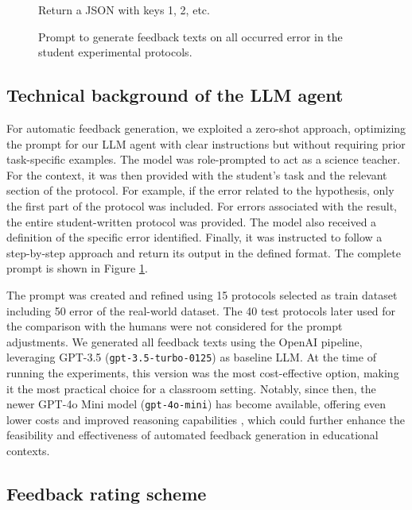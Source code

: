 \begin{figure}[htbp]
\begin{tcolorbox}[colback=gray!5!white, colframe=gray!75!black, width=\textwidth, arc=1mm, auto outer arc, boxrule=0.2mm, title=Prompt for automated feedback generation on experimental protocols]
\begin{small}
        Return a JSON with keys 1, 2, etc.
    \end{small}
    \end{tcolorbox}
    \caption{Prompt to generate feedback texts on all occurred error in the student experimental protocols.}\label{fig:prompt}
\end{figure}

\subsection{Technical background of the LLM agent}
For automatic feedback generation, we exploited a zero-shot approach, optimizing the prompt for our LLM agent with clear instructions but without requiring prior task-specific examples.
The model was role-prompted to act as a science teacher. For the context, it was then provided with the student's task and the relevant section of the protocol. For example, if the error related to the hypothesis, only the first part of the protocol was included. For errors associated with the result, the entire student-written protocol was provided. The model also received a definition of the specific error identified. Finally, it was instructed to follow a step-by-step approach and return its output in the defined format. The complete prompt is shown in Figure \ref{fig:prompt}.

The prompt was created and refined using 15 protocols selected as train dataset including 50 error of the real-world dataset. The 40 test protocols later used for the comparison with the humans were not considered for the prompt adjustments.
We generated all feedback texts using the OpenAI pipeline, leveraging GPT-3.5 (\texttt{gpt-3.5-turbo-0125}) as baseline LLM. At the time of running the experiments, this version was the most cost-effective option, making it the most practical choice for a classroom setting. 
Notably, since then, the newer GPT-4o Mini model (\texttt{gpt-4o-mini}) has become available, offering even lower costs and improved reasoning capabilities \cite{sessler2024benchmarking}, which could further enhance the feasibility and effectiveness of automated feedback generation in educational contexts.



\subsection{Feedback rating scheme} \label{sec:rating_scheme}

